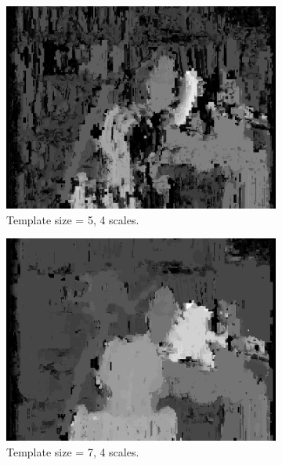 \documentclass[12pt,a4paper,oneside,final]{article}
\begin{document}
\begin{figure}[H]
\ContinuedFloat
\begin{subfigure}[b]{0.24\textwidth}
	\includegraphics[width=\textwidth]{disparity_s4_k5set_1.png}
	\caption{Template size = 5, 4 scales.}
\end{subfigure}
\begin{subfigure}[b]{0.24\textwidth}
	\includegraphics[width=\textwidth]{disparity_s4_k7set_1.png}
	\caption{Template size = 7, 4 scales.}
\end{subfigure}
\begin{subfigure}[b]{0.24\textwidth}

\end{subfigure}
\end{figure}
\end{document}
